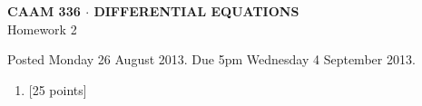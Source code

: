 \documentclass[10pt]{article}
\begin{document}
\vspace*{-5em}
\begin{center}
\large \textsf{\textbf{CAAM 336 $\cdot$ DIFFERENTIAL EQUATIONS}\\[0.5em]
Homework 2 }
\end{center}

Posted Monday 26 August 2013.  Due 5pm Wednesday 4 September 2013.

\begin{enumerate}\addtocounter{enumi}{1}
\item {[25 points]}\\  
\end{enumerate}
\end{document}
